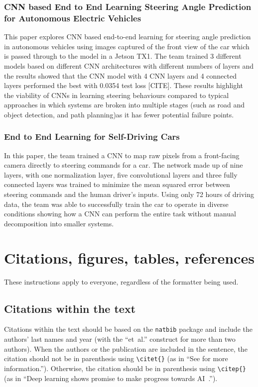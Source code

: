 \documentclass{article} %
\begin{document}
\subsubsection{CNN based End to End Learning Steering Angle Prediction for Autonomous Electric Vehicles}

This paper explores CNN based end-to-end learning for steering angle prediction in autonomous vehicles using images captured of the front 
view of the car which is passed through to the model in a Jetson TX1. The team trained 3 different models based on different CNN architectures 
with different numbers of layers and the results showed that the CNN model with 4 CNN layers and 4 connected layers performed the 
best with 0.0354 test loss [CITE]. These results highlight the viability of CNNs in learning steering behaviours compared to typical 
approaches in which systems are broken into multiple stages (such as road and object detection, and path planning)as it has fewer potential failure points.

\subsubsection{End to End Learning for Self-Driving Cars}

In this paper, the team trained a CNN to map raw pixels from a front-facing camera directly to steering commands for a car. 
The network made up of nine layers, with one normalization layer, five convolutional layers and three fully connected layers 
was trained to minimize the mean squared error between steering commands and the human driver’s inputs. Using only 
72 hours of driving data, the team was able to successfully train the car to operate in diverse conditions showing 
how a CNN can perform the entire task without manual decomposition into smaller systems. 



\section{Citations, figures, tables, references}
\label{others}

These instructions apply to everyone, regardless of the formatter being used.

\subsection{Citations within the text}

Citations within the text should be based on the \texttt{natbib} package
and include the authors' last names and year (with the ``et~al.'' construct
for more than two authors). When the authors or the publication are
included in the sentence, the citation should not be in parenthesis using \verb|\citet{}| (as
in ``See \citet{Hinton06} for more information.''). Otherwise, the citation
should be in parenthesis using \verb|\citep{}| (as in ``Deep learning shows promise to make progress
towards AI~\citep{Bengio+chapter2007}.'').
\end{document}
